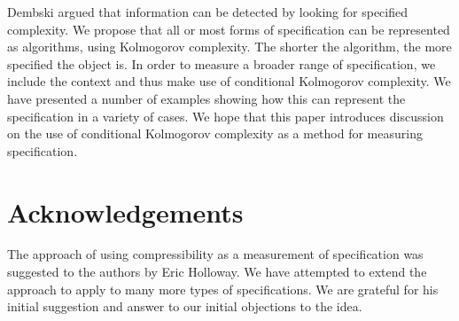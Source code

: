 Dembski argued that information can be detected by looking for specified complexity.
We propose that all or most forms of specification can be represented as algorithms, using Kolmogorov complexity.
The shorter the algorithm, the more specified the object is.
In order to measure a broader range of specification, we include the context and thus make use of conditional Kolmogorov complexity.
We have presented a number of examples showing how this can represent the specification in a variety of cases.
We hope that this paper introduces discussion on the use of conditional Kolmogorov complexity as a method for measuring specification.

\section*{Acknowledgements}

The approach of using compressibility as a measurement of specification was suggested to the authors by Eric Holloway.
We have attempted to extend the approach to apply to many more types of specifications.
We are grateful for his initial suggestion and answer to our initial objections to the idea.




